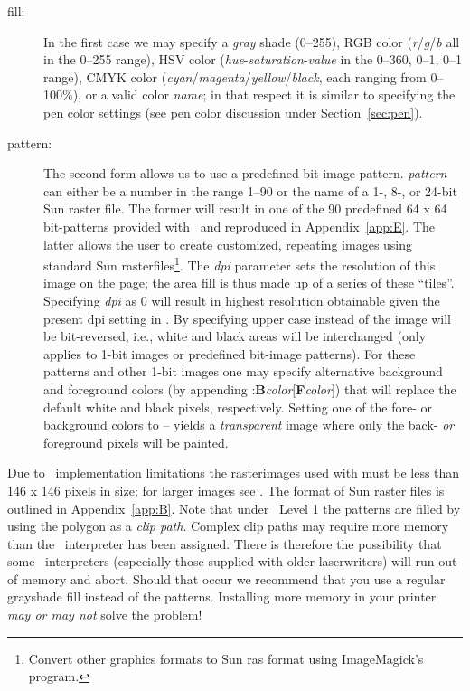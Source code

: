 \vspace{\baselineskip} 
\noindent
\begin{description}
\item [fill:]
In the first case we may specify a \emph{gray} shade (0--255), RGB color
(\emph{r}/\emph{g}/\emph{b} all in the 0--255 range), HSV color (\emph{hue}-\emph{saturation}-\emph{value}
in the 0--360, 0--1, 0--1 range), CMYK color (\emph{cyan}/\emph{magenta}/\emph{yellow}/\emph{black},
each ranging from 0--100\%), or a valid color \emph{name}; in that respect it is similar
to specifying the pen color settings (see pen color discussion under Section~\ref{sec:pen}).
\item [pattern:]
The second form allows us to use a predefined bit-image pattern.
\emph{pattern} can either be a number in the range 1--90 or the name of a 1-,
8-, or 24-bit Sun raster file.  The former will result in one of the 90
predefined 64 x 64 bit-patterns provided with \GMT\ and reproduced in Appendix~\ref{app:E}.
The latter allows the user to create customized, repeating images using
standard Sun rasterfiles\footnote{Convert other graphics formats to Sun ras format using
ImageMagick's  program.}.  The \emph{dpi} parameter sets the resolution of
this image on the page;  the area fill is thus made up of a series of these
``tiles''.  Specifying \emph{dpi} as 0 will result in highest resolution
obtainable given the present dpi setting in .
By specifying upper case  instead of  the image will be
bit-reversed, i.e., white and black areas will be interchanged (only applies
to 1-bit images or predefined bit-image patterns).  For these patterns and
other 1-bit images one may specify alternative background and foreground
colors (by appending :\textbf{B}\emph{color}[\textbf{F}\emph{color}]) that will
replace the default white and black pixels, respectively.  Setting one of the
fore- or background colors to -- yields a \emph{transparent} image where only the
back- \emph{or} foreground pixels will be painted.
\end{description}

Due to \PS\ implementation limitations the rasterimages used with
 must be less than 146 x 146 pixels in size; for larger images see
.  The format of Sun raster files is outlined in Appendix~\ref{app:B}.
Note that under \PS\ Level 1 the patterns are filled by using
the polygon as a \emph{clip path}.  Complex clip paths may require
more memory than the \PS\ interpreter has been assigned.
There is therefore the possibility that some \PS\ interpreters
(especially those supplied with older laserwriters) will run out of memory
and abort.  Should that occur we recommend that you use a regular grayshade
fill instead of the patterns.  Installing more memory in your printer
\emph{may or may not} solve the problem! 

